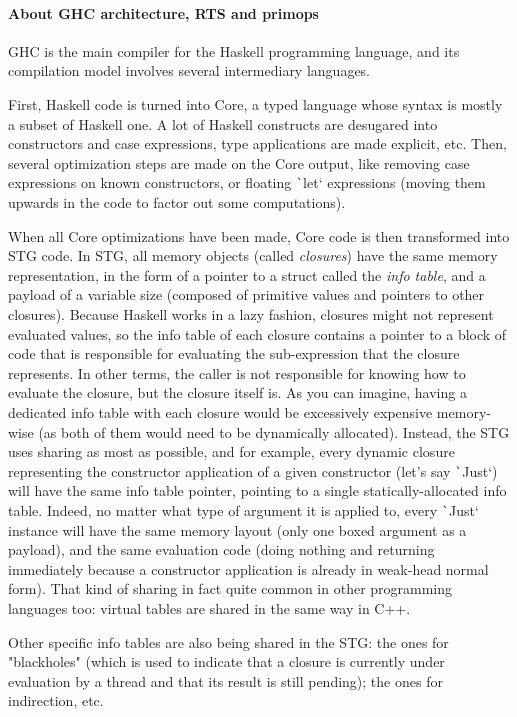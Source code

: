 \documentclass[english]{jflart}
\begin{document}
\paragraph{About GHC architecture, RTS and primops}

GHC is the main compiler for the Haskell programming language, and its compilation model involves several intermediary languages.

First, Haskell code is turned into Core, a typed language whose syntax is mostly a subset of Haskell one. A lot of Haskell constructs are desugared into constructors and case expressions, type applications are made explicit, etc.
Then, several optimization steps are made on the Core output, like removing case expressions on known constructors, or floating \texttt`let` expressions (moving them upwards in the code to factor out some computations).

When all Core optimizations have been made, Core code is then transformed into STG code. In STG, all memory objects (called \emph{closures}) have the same memory representation, in the form of a pointer to a struct called the \emph{info table}, and a payload of a variable size (composed of primitive values and pointers to other closures). Because Haskell works in a lazy fashion, closures might not represent evaluated values, so the info table of each closure contains a pointer to a block of code that is responsible for evaluating the sub-expression that the closure represents. In other terms, the caller is not responsible for knowing how to evaluate the closure, but the closure itself is.
As you can imagine, having a dedicated info table with each closure would be excessively expensive memory-wise (as both of them would need to be dynamically allocated). Instead, the STG uses sharing as most as possible, and for example, every dynamic closure representing the constructor application of a given constructor (let's say \texttt`Just`) will have the same info table pointer, pointing to a single statically-allocated info table. Indeed, no matter what type of argument it is applied to, every \texttt`Just` instance will have the same memory layout (only one boxed argument as a payload), and the same evaluation code (doing nothing and returning immediately because a constructor application is already in weak-head normal form). That kind of sharing in fact quite common in other programming languages too: virtual tables are shared in the same way in C++.

Other specific info tables are also being shared in the STG: the ones for "blackholes" (which is used to indicate that a closure is currently under evaluation by a thread and that its result is still pending); the ones for indirection, etc.
\end{document}
